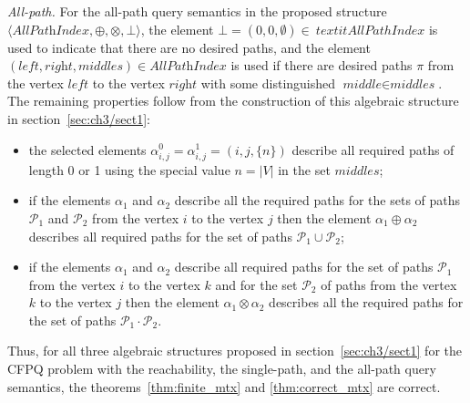 \textit{All-path.} %
For the all-path query semantics in the proposed structure $\langle \textit{AllPathIndex}, \oplus, \otimes, \bot \rangle$, the element $\bot = (0, 0, \emptyset) \in \ textit{AllPathIndex}$ is used to indicate that there are no desired paths, and the element $(\textit{left}, \textit{right}, \textit{middles}) \in \textit{AllPathIndex}$ is used if there are desired paths $\pi$ from the vertex $\textit{left}$ to the vertex $\textit{right}$ with some distinguished $\textit{middle} \in \textit{middles}$. The remaining properties follow from the construction of this algebraic structure in section~\ref{sec:ch3/sect1}:
\begin{itemize}
        \item the selected elements $\alpha^0_{i, j} = \alpha^1_{i, j} = (i, j, \{ n\})$ describe all required paths of length 0 or 1 using the special value $n = |V|$ in the set $\textit{middles}$;
	    \item if the elements $\alpha_1$ and $\alpha_2$ describe all the required paths for the sets of paths $\mathcal{P}_1$ and $\mathcal{P}_2$ from the vertex $i$ to the vertex $j$ then the element $\alpha_1 \oplus \alpha_2$ describes all required paths for the set of paths $\mathcal{P}_1 \cup \mathcal{P}_2$;
	    \item if the elements $\alpha_1$ and $\alpha_2$ describe all required paths for the set of paths $\mathcal{P}_1$ from the vertex $i$ to the vertex $k$ and for the set $\mathcal{P}_2$ of paths from the vertex $k$ to the vertex $j$ then the element $\alpha_1 \otimes \alpha_2$ describes all the required paths for the set of paths $\mathcal{P}_1 \cdot \mathcal{P}_2$.
	\end{itemize}
	
Thus, for all three algebraic structures proposed in section~\ref{sec:ch3/sect1} for the CFPQ problem with the reachability, the single-path, and the all-path query semantics, the theorems~\ref{thm:finite_mtx} and \ref{thm:correct_mtx} are correct.

